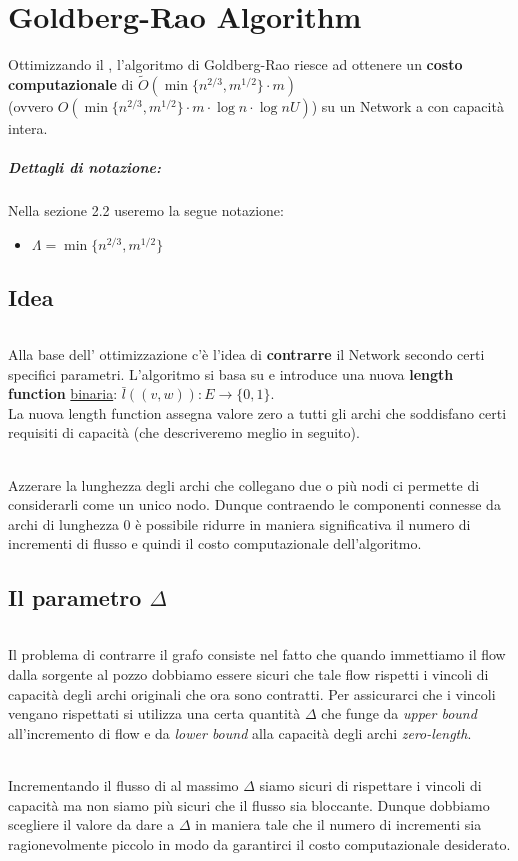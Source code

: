 
\chapter{Goldberg-Rao Algorithm} \label{gbr}

\label{gbr}
Ottimizzando il , l'algoritmo di Goldberg-Rao riesce ad ottenere un \textbf{costo computazionale} di $\tilde{O}(\min\{n^{2/3}, m^{1/2}\} \cdot m)$ \\(ovvero $O(\min\{n^{2/3}, m^{1/2}\} \cdot m \cdot \log n \cdot \log nU )$)
su un Network a con capacità intera.
\paragraph*{Dettagli di notazione:}
Nella sezione 2.2 useremo la segue notazione:
\begin{itemize}
    \item $\Lambda = \min\{n^{2/3}, m^{1/2}\}$
\end{itemize}

\section{Idea}
    \subparagraph{}
    Alla base dell' ottimizzazione c'è l'idea di \textbf{contrarre} il Network secondo certi specifici parametri.
    L'algoritmo si basa su  e introduce una nuova \textbf{length function} \underline{binaria}: $\bar{l}((v,w)): E\rightarrow \{0,1\}$.\\
    La nuova length function assegna valore zero a tutti gli archi che soddisfano certi requisiti di capacità (che descriveremo meglio in seguito).
    \subparagraph{}
    Azzerare la lunghezza degli archi che collegano due o più nodi ci permette di considerarli come un unico nodo. 
    Dunque contraendo le componenti connesse da archi di lunghezza 0 è possibile ridurre in maniera significativa il numero di incrementi di flusso e quindi il costo computazionale dell'algoritmo.

\section{Il parametro $\Delta$}
    \subparagraph{}
    Il problema di contrarre il grafo consiste nel fatto che quando immettiamo il flow dalla sorgente al pozzo dobbiamo essere sicuri che tale flow rispetti i vincoli di capacità degli archi originali che ora sono contratti.
    Per assicurarci che i vincoli vengano rispettati si utilizza una certa quantità $\Delta$ che funge da \textit{upper bound} all'incremento di flow e da \textit{lower bound} alla capacità degli archi \textit{zero-length}. 
    \subparagraph{}
    Incrementando il flusso di al massimo $\Delta$ siamo sicuri di rispettare i vincoli di capacità ma non siamo più sicuri che il flusso sia bloccante.
    Dunque dobbiamo scegliere il valore da dare a $\Delta$ in maniera tale che il numero di incrementi sia ragionevolmente piccolo in modo da garantirci il costo computazionale desiderato.

